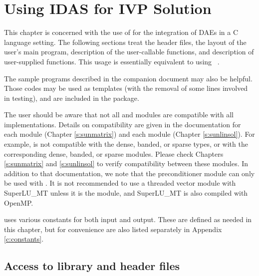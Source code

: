 \chapter{Using IDAS for IVP Solution}\label{s:simulation}

This chapter is concerned with the use of {\idas} for the integration
of DAEs in a C language setting.  The following sections treat the header files,
the layout of the user's main program, description of the {\idas} user-callable
functions, and description of user-supplied functions.
This usage is essentially equivalent to using {\ida}~\cite{ida_ug}.

The sample programs described in the companion document \cite{idas_ex}
may also be helpful. Those codes may be used as templates (with the removal of
some lines involved in testing), and are included in the {\idas} package.

The user should be aware that not all {\sunlinsol} and {\sunmatrix}
modules are compatible with all {\nvector} implementations.
Details on compatibility are given in the documentation for each
{\sunmatrix} module (Chapter \ref{s:sunmatrix}) and each {\sunlinsol}
module (Chapter \ref{s:sunlinsol}). For example, {\nvecp} is not
compatible with the dense, banded, or sparse {\sunmatrix} types, or with
the corresponding dense, banded, or sparse {\sunlinsol} modules.  Please
check Chapters \ref{s:sunmatrix} and \ref{s:sunlinsol} to verify
compatibility between these modules.  In addition to that
documentation, we note that the preconditioner module {\idabbdpre}
can only be used with {\nvecp}.
It is not recommended to use a threaded vector module with SuperLU\_MT
unless it is the {\nvecopenmp} module, and SuperLU\_MT is also compiled
with OpenMP.

{\idas} uses various constants for both input and output.  These are
defined as needed in this chapter, but for convenience are also listed
separately in Appendix \ref{c:constants}.

\section{Access to library and header files}\label{ss:file_access}

